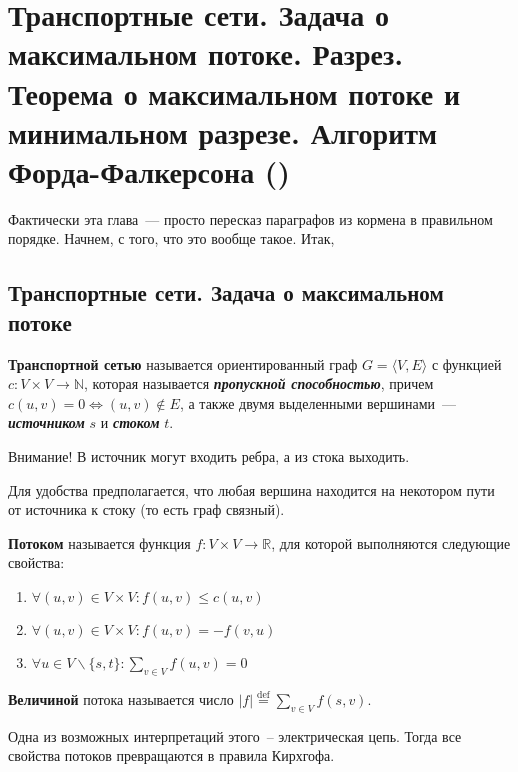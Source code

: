 \let\bf\bfseries
\let\it\itshape
\section{Транспортные сети. Задача о максимальном потоке. Разрез. Теорема о максимальном потоке и минимальном разрезе. Алгоритм Форда-Фалкерсона (\groth)}
Фактически эта глава~--- просто пересказ параграфов из кормена в правильном порядке. Начнем, с того, что это вообще такое. Итак,
\subsection{Транспортные сети. Задача о максимальном потоке}
\begin{definition}
	{\bf Транспортной сетью} называется ориентированный граф $G=\langle V,E\rangle$ с функцией $c\colon V\times V\to\mathbb{N}$, которая называется {\bf\it пропускной способностью}, причем $c(u,v)=0\iff (u,v)\not\in E$, а также двумя выделенными вершинами~--- {\bf\it источником} $s$ и {\bf\it стоком} $t$.
\end{definition}
Внимание! В источник могут входить ребра, а из стока выходить.

Для удобства предполагается, что любая вершина находится на некотором пути от источника к стоку (то есть граф связный).
\begin{example}
	\needpicture
\end{example}
\begin{definition}
	{\bfseries Потоком} называется функция $f\colon V\times V\to\mathbb{R}$, для которой выполняются следующие свойства:
	\begin{enumerate}
		\item $\forall(u,v)\in V\times V\colon f(u,v)\le c(u,v)$
		\item $\forall(u,v)\in V\times V\colon f(u,v)=-f(v,u)$
		\item $\forall u\in V\smallsetminus\{s,t\}\colon \sum_{v\in V} f(u,v)=0$
	\end{enumerate}
	{\bfseries Величиной} потока называется число $|f|\overset{\mathrm{def}}{=}\sum_{v\in V}f(s,v)$.
\end{definition}
Одна из возможных интерпретаций этого~-- электрическая цепь. Тогда все свойства потоков превращаются в правила Кирхгофа.

